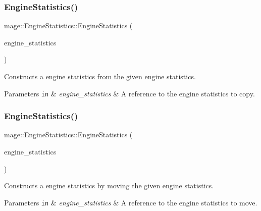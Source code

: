 \subsubsection{\texorpdfstring{Engine\+Statistics()}{EngineStatistics()}\hspace{0.1cm}{\footnotesize\ttfamily [2/3]}}
{\footnotesize\ttfamily mage\+::\+Engine\+Statistics\+::\+Engine\+Statistics (\begin{DoxyParamCaption}\item[{const \hyperlink{structmage_1_1_engine_statistics}{Engine\+Statistics} \&}]{engine\+\_\+statistics }\end{DoxyParamCaption})\hspace{0.3cm}{\ttfamily [default]}}

Constructs a engine statistics from the given engine statistics.


\begin{DoxyParams}[1]{Parameters}
\mbox{\tt in}  & {\em engine\+\_\+statistics} & A reference to the engine statistics to copy. \\
\hline
\end{DoxyParams}
\hypertarget{structmage_1_1_engine_statistics_acb3eb7a8f16733d29b4a0e4490723cd5}{}\label{structmage_1_1_engine_statistics_acb3eb7a8f16733d29b4a0e4490723cd5} 
\subsubsection{\texorpdfstring{Engine\+Statistics()}{EngineStatistics()}\hspace{0.1cm}{\footnotesize\ttfamily [3/3]}}
{\footnotesize\ttfamily mage\+::\+Engine\+Statistics\+::\+Engine\+Statistics (\begin{DoxyParamCaption}\item[{\hyperlink{structmage_1_1_engine_statistics}{Engine\+Statistics} \&\&}]{engine\+\_\+statistics }\end{DoxyParamCaption})\hspace{0.3cm}{\ttfamily [default]}}

Constructs a engine statistics by moving the given engine statistics.


\begin{DoxyParams}[1]{Parameters}
\mbox{\tt in}  & {\em engine\+\_\+statistics} & A reference to the engine statistics to move. \\
\hline
\end{DoxyParams}
\hypertarget{structmage_1_1_engine_statistics_a471f643061b881ae69cc807b34c48127}{}\label{structmage_1_1_engine_statistics_a471f643061b881ae69cc807b34c48127} 

